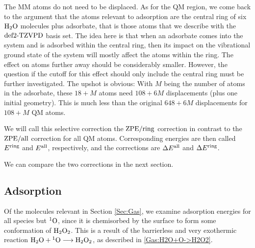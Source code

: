 The MM atoms do not need to be displaced. 
As for the QM region, we come back to the argument that the atoms relevant to
adsorption are the central ring of six $\text H _2 \text O$ molecules plus adsorbate, that is
those atoms that we describe with the $\text{def2-TZVPD}$ basis set. The idea here is that
when an adsorbate comes into the system and is adsorbed within the central
ring, then its impact on the vibrational ground state of the system will mostly
affect the atoms within the ring. The effect on atoms further away should be
considerably smaller. However, the question if the cutoff for this effect should
only include the central ring must be further investigated. The upshot is
obvious: With $M$ being the number of atoms in the adsorbate, these $18+M$
atoms need $108+6M$ displacements (plus one initial geometry). This is much
less than the original $648+6M$ displacements for $108+M$ QM atoms.

We will call this selective correction the $\text{ZPE}/\text{ring}$ correction in contrast to
the $\text{ZPE}/\text{all}$ correction for all QM atoms. Corresponding energies are then called
$E^{\text{ring}}$ and $E^{\text{all}}$, respectively, and the corrections are $\Delta E^{\text{all}}$ and $\Delta E^{\text{ring}}$. 

We can compare the two corrections in the next section.



\subsection{Adsorption}
\label{Sec:Ads:Adsorption}
\newcommand\avg{\enmat{E_{\te {avg}}^{\te{ads}}}}
Of the molecules relevant in Section \ref{Sec:Gas}, we examine adsorption
energies for all species but ${^1\text{O}}$, since it is chemisorbed by the surface
to form some conformation of $\text H _2 \text O_2$. This is a result of the barrierless
and very exothermic reaction \mbox{$\text H _2 \text O+{^1\text{O}}\longrightarrow\text H _2 \text O_2$}, as described in
\eqref{Gas:H2O+O->H2O2}.

